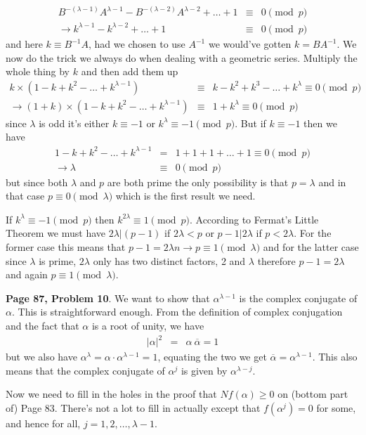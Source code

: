 \documentclass[aps,preprint,preprintnumbers,nofootinbib,showpacs,prd]{revtex4-1}
\newcommand{\nbea}{\begin{eqnarray*}}
\newcommand{\neea}{\end{eqnarray*}}
\begin{document}
%
\nbea
B^{-(\lambda - 1)}A^{\lambda-1} - B^{-(\lambda - 2)}A^{\lambda - 2}  + \dots + 1 & \equiv & 0 \pmod{p} \\
\to k^{\lambda-1} - k^{\lambda - 2} +  \dots + 1 & \equiv & 0 \pmod{p}
\neea
%
and here $k \equiv B^{-1}A$, had we chosen to use $A^{-1}$ we would've gotten $k = BA^{-1}$. We now do the trick we always do when dealing with a geometric series. Multiply the whole thing by $k$ and then add them up
%
\nbea
k \times (1 - k + k^2 - \dots + k^{\lambda - 1}) & \equiv & k - k^2 + k^3 - \dots + k^{\lambda} \equiv 0 \pmod{p} \\
\to (1 + k) \times (1 - k + k^2 - \dots + k^{\lambda - 1})  & \equiv & 1 + k^{\lambda} \equiv 0 \pmod{p}
\neea
%
since $\lambda$ is odd it's either $k \equiv -1$ or $k^{\lambda} \equiv -1 \pmod{p}$. But if $k \equiv -1$ then we have
%
\nbea
1 - k + k^2 - \dots + k^{\lambda - 1} & = & 1 + 1 + 1 + \dots + 1 \equiv 0 \pmod{p} \\
\to \lambda & \equiv & 0 \pmod{p}
\neea
%
but since both $\lambda$ and $p$ are both prime the only possibility is that $p = \lambda$ and in that case $p \equiv 0 \pmod{\lambda}$ which is the first result we need.

If $k^{\lambda} \equiv -1 \pmod{p}$ then $k^{2\lambda} \equiv 1 \pmod{p}$. According to Fermat's Little Theorem we must have $2\lambda|(p-1)$ if $2\lambda < p$ or $p-1|2\lambda$ if $p < 2\lambda$. For the former case this means that $p - 1 = 2\lambda n \to p \equiv 1 \pmod{\lambda}$ and for the latter case since $\lambda$ is prime, $2\lambda$ only has two distinct factors, 2 and $\lambda$ therefore $p - 1 = 2\lambda$ and again $p \equiv 1 \pmod{\lambda}$.

{\bf Page 87, Problem 10}. We want to show that $\alpha^{\lambda-1}$ is the complex conjugate of $\alpha$. This is straightforward enough. From the definition of complex conjugation and the fact that $\alpha$ is a root of unity, we have
%
\nbea
|\alpha|^2 & = & \alpha ~\overline{\alpha} = 1
\neea
%
but we also have $\alpha^{\lambda} = \alpha \cdot \alpha^{\lambda-1} = 1$, equating the two we get $\overline{\alpha} = \alpha^{\lambda-1}$. This also means that the complex conjugate of $\alpha^j$ is given by $\alpha^{\lambda-j}$.

Now we need to fill in the holes in the proof that $Nf(\alpha) \ge 0$ on (bottom part of) Page 83. There's not a lot to fill in actually except that $f(\alpha^j) = 0$ for some, and hence for all, $j = 1,2,\dots, \lambda-1$.
\end{document}
